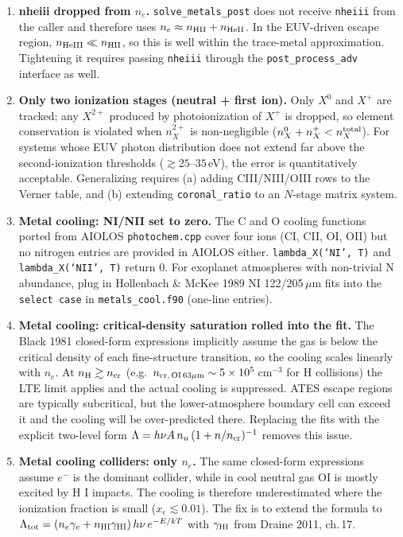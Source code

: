 \documentclass[english,a4paper]{my_memo}
\begin{document}
\begin{enumerate}
\item \textbf{nheiii dropped from $n_e$.} \texttt{solve\_metals\_post} does
not receive \texttt{nheiii} from the caller and therefore uses
$n_e \approx n_{\rm HII} + n_{\rm HeII}$. In the EUV-driven escape region,
$n_{\rm HeIII} \ll n_{\rm HII}$, so this is well within the trace-metal
approximation. Tightening it requires passing \texttt{nheiii} through the
\texttt{post\_process\_adv} interface as well.

\item \textbf{Only two ionization stages (neutral + first ion).} Only $X^0$
and $X^+$ are tracked; any $X^{2+}$ produced by photoionization of $X^+$
is dropped, so element conservation is violated when $n_X^{2+}$ is
non-negligible ($n_X^0 + n_X^+ < n_X^{\rm total}$). For systems whose EUV
photon distribution does not extend far above the second-ionization
thresholds ($\gtrsim 25$--$35\,$eV), the error is quantitatively acceptable.
Generalizing requires (a) adding CIII/NIII/OIII rows to the Verner table,
and (b) extending \texttt{coronal\_ratio} to an $N$-stage matrix system.

\item \textbf{Metal cooling: NI/NII set to zero.} The C and O cooling
functions ported from AIOLOS \texttt{photochem.cpp} cover four ions
(CI, CII, OI, OII) but no nitrogen entries are provided in AIOLOS
either. \texttt{lambda\_X(`NI', T)} and \texttt{lambda\_X(`NII', T)}
return 0. For exoplanet atmospheres with non-trivial N abundance,
plug in Hollenbach \& McKee 1989 NI 122/205\,$\mu$m fits into the
\texttt{select case} in \texttt{metals\_cool.f90} (one-line entries).

\item \textbf{Metal cooling: critical-density saturation rolled into
the fit.} The Black 1981 closed-form expressions implicitly assume
the gas is below the critical density of each fine-structure
transition, so the cooling scales linearly with $n_e$. At
$n_{\rm H} \gtrsim n_{\rm cr}$ (e.g.\ $n_{\rm cr,\,OI\,63\mu m}
\sim 5\times 10^5\,$cm$^{-3}$ for H collisions) the LTE limit
applies and the actual cooling is suppressed. ATES escape regions are
typically subcritical, but the lower-atmosphere boundary cell can
exceed it and the cooling will be over-predicted there. Replacing
the fits with the explicit two-level form
$\Lambda = h\nu A\,n_u\,(1 + n/n_{\rm cr})^{-1}$ removes this issue.

\item \textbf{Metal cooling colliders: only $n_e$.} The same
closed-form expressions assume $e^-$ is the dominant collider, while
in cool neutral gas OI is mostly excited by H I impacts. The cooling
is therefore underestimated where the ionization fraction is small
($x_e \lesssim 0.01$). The fix is to extend the formula to
$\Lambda_{\rm tot} = (n_e \gamma_e + n_{\rm HI} \gamma_{\rm HI})\,h\nu\,e^{-E/kT}$
with $\gamma_{\rm HI}$ from Draine 2011, ch.\,17.


\end{enumerate}
\end{document}

